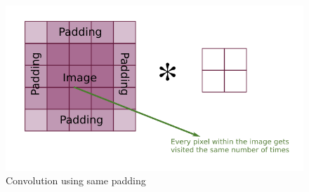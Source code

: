                 \begin{figure}[h]                 
                    \centering                 
                    \includegraphics[width=.9\textwidth]{img/experiment/samepad.png}                 
                    \caption{Convolution using same padding}                 
                    \label{fig:Convolution using same padding}         
                \end{figure}
